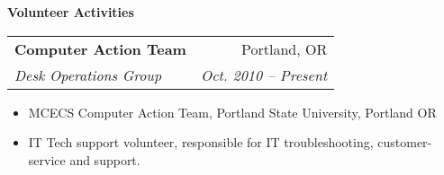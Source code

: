 \documentclass[letterpaper,11pt]{article}
\makeatletter
\newcommand{\resitem}[1]{\item #1 \vspace{-2pt}}
\newcommand{\resheading}[1]{{\large \colorbox{mygrey}{\begin{minipage}{\textwidth}{\textbf{#1 \vphantom{p\^{E}}}}\end{minipage}}}}
\newcommand{\ressubheading}[4]{
\begin{tabular*}{6.75in}{l@{\extracolsep{\fill}}r}
		\textbf{#1} & #2 \\
		\textit{#3} & \textit{#4} \\
\end{tabular*}\vspace{-6pt}}
\makeatother
\begin{document}
\resheading{Volunteer Activities}
	\begin{description}
		\item			
			\ressubheading{Computer Action Team}{Portland, OR}{\textcolor{mygreylink}{Desk Operations Group}}{Oct. 2010 -- Present}
				{ \footnotesize				
				\begin{itemize}
                    \resitem{MCECS Computer Action Team, Portland State University, Portland OR}
                    \resitem{IT Tech support volunteer, responsible for IT troubleshooting, customer-service and support.}
				\end{itemize}
				}

	\end{description} %
\end{document}
